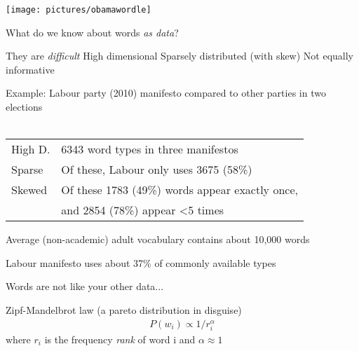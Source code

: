 \documentclass{mediumfoils}
\begin{document}
\begin{center}
\texttt{[image: pictures/obamawordle]}
\end{center}



What do we know about words \textit{as data}? 

They are \textit{difficult}
\ita
\itm High dimensional 
\itm Sparsely distributed (with skew)
\itm Not equally informative
\itz



Example: Labour party (2010) manifesto compared to other parties in two elections\\
~\\
\begin{tabular}{ll}
High D. & 6343 word types in three manifestos \\
Sparse & Of these, Labour only uses 3675 (58\%)\\ 
Skewed &  Of these 1783 (49\%) words appear exactly once,\\
       &  and 2854 (78\%) appear <5 times
\end{tabular}

Average (non-academic) adult vocabulary contains about 10,000 words 

Labour manifesto uses about 37\% of commonly available types




Words are not like your other data... 

Zipf-Mandelbrot law (a pareto distribution in disguise) 
\begin{align*}
P(w_i) \propto 1/{r_i^\alpha}
\end{align*}
where $r_i$ is the frequency \textsl{rank} of word i and $\alpha\approx 1$
\end{document}
